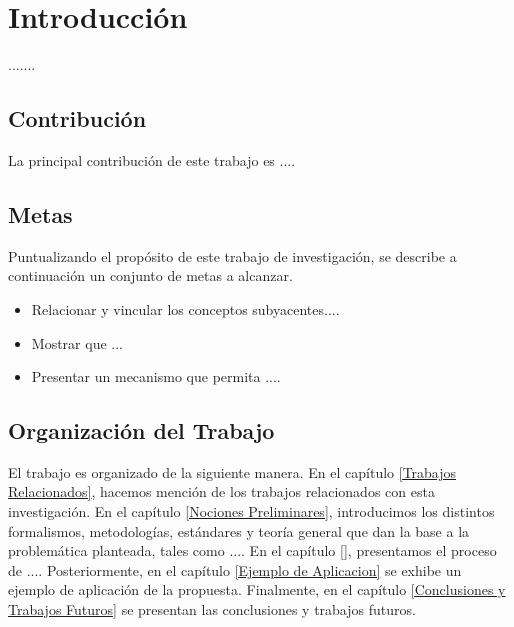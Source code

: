 \chapter{Introducción}
\label{Introduccion}

.......


\setcounter{page}{1}


\section{Contribución}
\label{Contribucion del Trabajo}

La principal contribución de este trabajo es .... 

\section{Metas}
\label{Metas}

Puntualizando el propósito de este trabajo de investigación, se describe a continuación un conjunto de metas a alcanzar.
\begin{itemize}
 \item Relacionar y vincular los conceptos subyacentes....
 \item Mostrar que ...
 \item Presentar un mecanismo que permita  ....
\end{itemize}


\section{Organización del Trabajo}
\label{Organizacion del Trabajo}


El trabajo es organizado de la siguiente manera. 
En el capítulo \ref{Trabajos Relacionados}, hacemos mención de los trabajos relacionados con esta investigación. En el capítulo \ref{Nociones Preliminares}, introducimos los distintos formalismos, metodologías, estándares y 
teoría general que dan la base a la problemática planteada, tales como ....
En el capítulo \ref{}, presentamos el proceso de ....
Posteriormente, en el capítulo \ref{Ejemplo de Aplicacion} se exhibe un ejemplo de aplicación de la propuesta.
Finalmente, en el capítulo \ref{Conclusiones y Trabajos Futuros} se presentan las conclusiones y trabajos futuros.

